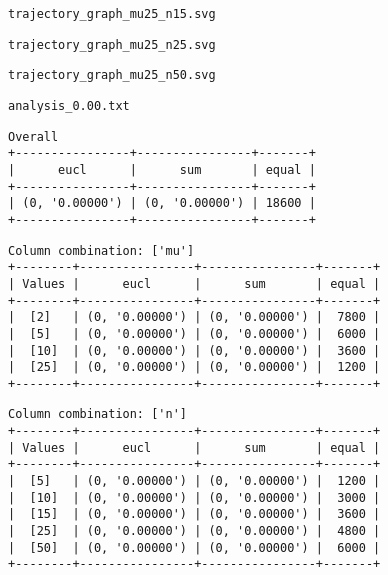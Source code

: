 \documentclass{article}
\begin{document}
\begin{figure}[t]
\centering

\vskip-8pt
\end{figure}
\newpage
\verb|trajectory_graph_mu25_n15.svg|
\begin{figure}[t]
\centering

\vskip-8pt
\end{figure}
\newpage
\verb|trajectory_graph_mu25_n25.svg|
\begin{figure}[t]
\centering

\vskip-8pt
\end{figure}
\newpage
\verb|trajectory_graph_mu25_n50.svg|
\begin{figure}[t]
\centering

\vskip-8pt
\end{figure}
\newpage
\verb|analysis_0.00.txt|
\begin{verbatim}
Overall
+----------------+----------------+-------+
|      eucl      |      sum       | equal |
+----------------+----------------+-------+
| (0, '0.00000') | (0, '0.00000') | 18600 |
+----------------+----------------+-------+
\end{verbatim}

\begin{verbatim}
Column combination: ['mu']
+--------+----------------+----------------+-------+
| Values |      eucl      |      sum       | equal |
+--------+----------------+----------------+-------+
|  [2]   | (0, '0.00000') | (0, '0.00000') |  7800 |
|  [5]   | (0, '0.00000') | (0, '0.00000') |  6000 |
|  [10]  | (0, '0.00000') | (0, '0.00000') |  3600 |
|  [25]  | (0, '0.00000') | (0, '0.00000') |  1200 |
+--------+----------------+----------------+-------+
\end{verbatim}

\begin{verbatim}
Column combination: ['n']
+--------+----------------+----------------+-------+
| Values |      eucl      |      sum       | equal |
+--------+----------------+----------------+-------+
|  [5]   | (0, '0.00000') | (0, '0.00000') |  1200 |
|  [10]  | (0, '0.00000') | (0, '0.00000') |  3000 |
|  [15]  | (0, '0.00000') | (0, '0.00000') |  3600 |
|  [25]  | (0, '0.00000') | (0, '0.00000') |  4800 |
|  [50]  | (0, '0.00000') | (0, '0.00000') |  6000 |
+--------+----------------+----------------+-------+
\end{verbatim}
\end{document}
